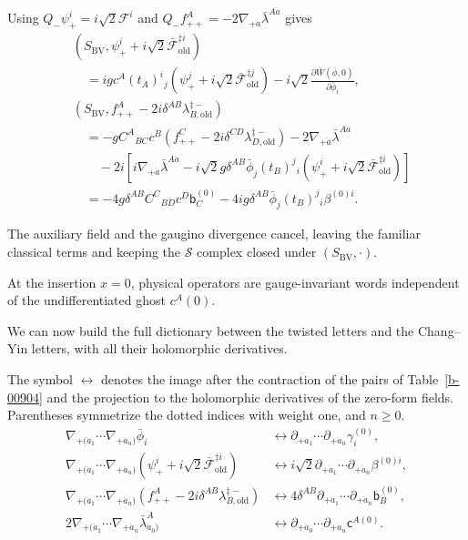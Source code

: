 \documentclass[11pt]{article}
\numberwithin{equation}{section}
\numberwithin{figure}{section}
\numberwithin{table}{section}
\begin{document}
Using $Q_-\psi_+^i=i\sqrt2\mathcal F^i$ and $Q_-f_{++}^A=-2\nabla_{+\dot a}\bar\lambda^{A\dot a}$ gives
\begin{equation}\label{eq-CY-completion-images}
\begin{aligned}
&(S_{\mathrm{BV}},
 \psi_+^i+i\sqrt2\bar{\mathcal F}_{\mathrm{old}}^{\ddagger i})\\
&\quad=igc^A(t_A)^i{}_j\left(\psi_+^j+i\sqrt2\bar{\mathcal F}_{\mathrm{old}}^{\ddagger j}\right)
-i\sqrt2\frac{\partial\bar W(\bar\phi,0)}{\partial\bar\phi_i},\\
&(S_{\mathrm{BV}},f_{++}^A-2i\delta^{AB}\lambda_{B,\mathrm{old}}^{\ddagger-})\\
&\quad=-gC^A{}_{BC}c^B\left(f_{++}^C-2i\delta^{CD}\lambda_{D,\mathrm{old}}^{\ddagger-}\right)
-2\nabla_{+\dot a}\bar\lambda^{A\dot a}\\
&\qquad-2i\left[i\nabla_{+\dot a}\bar\lambda^{A\dot a}
-i\sqrt2g\delta^{AB}\bar\phi_j(t_B)^j{}_i
 \left(\psi_+^i+i\sqrt2\bar{\mathcal F}_{\mathrm{old}}^{\ddagger i}\right)\right]\\
&\quad=-4g\delta^{AB}C^C{}_{BD}c^D\mathsf b_C^{(0)}
-4ig\delta^{AB}\bar\phi_j(t_B)^j{}_i\beta^{(0)i}.
\end{aligned}
\end{equation}

The auxiliary field and the gaugino divergence cancel, leaving the familiar classical terms and keeping the $\mathcal S$ complex closed under $(S_{\mathrm{BV}},\cdot)$.

At the insertion $x=0$, physical operators are gauge-invariant words independent of the undifferentiated ghost $c^A(0)$.

We can now build the full dictionary between the twisted letters and the Chang--Yin letters, with all their holomorphic derivatives.

The symbol $\longleftrightarrow$ denotes the image after the contraction of the pairs of Table~\ref{b-00904} and the projection to the holomorphic derivatives of the zero-form fields. Parentheses symmetrize the dotted indices with weight one, and $n\ge0$.
\begin{equation}\label{eq-B-14}
\begin{aligned}
\nabla_{+(\dot a_1}\cdots\nabla_{+\dot a_n)}\bar\phi_i
&\longleftrightarrow
\partial_{+\dot a_1}\cdots\partial_{+\dot a_n}\gamma_i^{(0)},\\
\nabla_{+(\dot a_1}\cdots\nabla_{+\dot a_n)}
\left(\psi_+^i+i\sqrt2\bar{\mathcal F}_{\mathrm{old}}^{\ddagger i}\right)
&\longleftrightarrow
 i\sqrt2\partial_{+\dot a_1}\cdots\partial_{+\dot a_n}\beta^{(0)i},\\
\nabla_{+(\dot a_1}\cdots\nabla_{+\dot a_n)}
\left(f_{++}^A-2i\delta^{AB}\lambda_{B,\mathrm{old}}^{\ddagger-}\right)
&\longleftrightarrow
 4\delta^{AB}\partial_{+\dot a_1}\cdots\partial_{+\dot a_n}\mathsf b_B^{(0)},\\
2\nabla_{+(\dot a_1}\cdots\nabla_{+\dot a_n}\bar\lambda_{\dot a_0)}^A
&\longleftrightarrow
\partial_{+\dot a_0}\cdots\partial_{+\dot a_n}\mathsf c^{A(0)}.
\end{aligned}
\end{equation}
\end{document}
